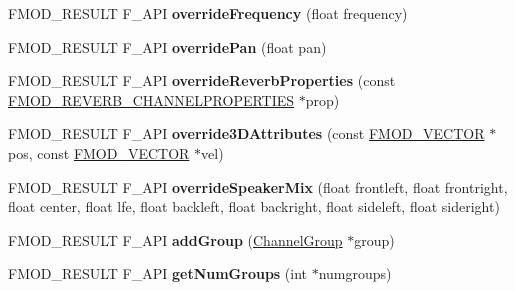 \begin{DoxyCompactItemize}
\item 
\hypertarget{class_f_m_o_d_1_1_channel_group_ac15d292ec1377f365cc2e966a0778e0c}{F\-M\-O\-D\-\_\-\-R\-E\-S\-U\-L\-T F\-\_\-\-A\-P\-I {\bfseries override\-Frequency} (float frequency)}\label{class_f_m_o_d_1_1_channel_group_ac15d292ec1377f365cc2e966a0778e0c}

\item 
\hypertarget{class_f_m_o_d_1_1_channel_group_a5e1fae774340fed154eb6e72917f9c59}{F\-M\-O\-D\-\_\-\-R\-E\-S\-U\-L\-T F\-\_\-\-A\-P\-I {\bfseries override\-Pan} (float pan)}\label{class_f_m_o_d_1_1_channel_group_a5e1fae774340fed154eb6e72917f9c59}

\item 
\hypertarget{class_f_m_o_d_1_1_channel_group_a9d6ce9816c6c45180987a951125353fa}{F\-M\-O\-D\-\_\-\-R\-E\-S\-U\-L\-T F\-\_\-\-A\-P\-I {\bfseries override\-Reverb\-Properties} (const \hyperlink{struct_f_m_o_d___r_e_v_e_r_b___c_h_a_n_n_e_l_p_r_o_p_e_r_t_i_e_s}{F\-M\-O\-D\-\_\-\-R\-E\-V\-E\-R\-B\-\_\-\-C\-H\-A\-N\-N\-E\-L\-P\-R\-O\-P\-E\-R\-T\-I\-E\-S} $\ast$prop)}\label{class_f_m_o_d_1_1_channel_group_a9d6ce9816c6c45180987a951125353fa}

\item 
\hypertarget{class_f_m_o_d_1_1_channel_group_aeabcc63a4a5668ed80a4e1bcafeaa159}{F\-M\-O\-D\-\_\-\-R\-E\-S\-U\-L\-T F\-\_\-\-A\-P\-I {\bfseries override3\-D\-Attributes} (const \hyperlink{struct_f_m_o_d___v_e_c_t_o_r}{F\-M\-O\-D\-\_\-\-V\-E\-C\-T\-O\-R} $\ast$pos, const \hyperlink{struct_f_m_o_d___v_e_c_t_o_r}{F\-M\-O\-D\-\_\-\-V\-E\-C\-T\-O\-R} $\ast$vel)}\label{class_f_m_o_d_1_1_channel_group_aeabcc63a4a5668ed80a4e1bcafeaa159}

\item 
\hypertarget{class_f_m_o_d_1_1_channel_group_a69b1616ac61b95721dc0e0e1542a499d}{F\-M\-O\-D\-\_\-\-R\-E\-S\-U\-L\-T F\-\_\-\-A\-P\-I {\bfseries override\-Speaker\-Mix} (float frontleft, float frontright, float center, float lfe, float backleft, float backright, float sideleft, float sideright)}\label{class_f_m_o_d_1_1_channel_group_a69b1616ac61b95721dc0e0e1542a499d}

\item 
\hypertarget{class_f_m_o_d_1_1_channel_group_acd57c9678884e01c71836520b5335516}{F\-M\-O\-D\-\_\-\-R\-E\-S\-U\-L\-T F\-\_\-\-A\-P\-I {\bfseries add\-Group} (\hyperlink{class_f_m_o_d_1_1_channel_group}{Channel\-Group} $\ast$group)}\label{class_f_m_o_d_1_1_channel_group_acd57c9678884e01c71836520b5335516}

\item 
\hypertarget{class_f_m_o_d_1_1_channel_group_afa0b87ae5828685c64c1aa921872fd58}{F\-M\-O\-D\-\_\-\-R\-E\-S\-U\-L\-T F\-\_\-\-A\-P\-I {\bfseries get\-Num\-Groups} (int $\ast$numgroups)}\label{class_f_m_o_d_1_1_channel_group_afa0b87ae5828685c64c1aa921872fd58}


\end{DoxyCompactItemize}
